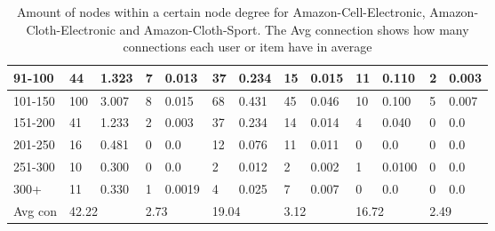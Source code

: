 \begin{table*}[]
\begin{tabular}{|l|l|l|l|l|l|l|l|l|l|l|l|l|}
        91-100  & 44                                          & 1.323                                        & 7                                       & 0.013                      & 37                         & 0.234                      & 15    & 0.015 & 11   & 0.110  & 2     & 0.003 \\ \hline
        101-150 & 100                                         & 3.007                                        & 8                                       & 0.015                      & 68                         & 0.431                      & 45    & 0.046 & 10   & 0.100  & 5     & 0.007 \\ \hline
        151-200 & 41                                          & 1.233                                        & 2                                       & 0.003                      & 37                         & 0.234                      & 14    & 0.014 & 4    & 0.040  & 0     & 0.0   \\ \hline
        201-250 & 16                                          & 0.481                                        & 0                                       & 0.0                        & 12                         & 0.076                      & 11    & 0.011 & 0    & 0.0    & 0     & 0.0   \\ \hline
        251-300 & 10                                          & 0.300                                        & 0                                       & 0.0                        & 2                          & 0.012                      & 2     & 0.002 & 1    & 0.0100 & 0     & 0.0   \\ \hline
        300+    & 11                                          & 0.330                                        & 1                                       & 0.0019                     & 4                          & 0.025                      & 7     & 0.007 & 0    & 0.0    & 0     & 0.0   \\ \hline
        Avg con & \multicolumn{2}{l|}{42.22}                  & \multicolumn{2}{l|}{2.73}                    & \multicolumn{2}{l|}{19.04}              & \multicolumn{2}{l|}{3.12}  & \multicolumn{2}{l|}{16.72} & \multicolumn{2}{l|}{2.49}                                                  \\ \hline
    \end{tabular}
    \caption{Amount of nodes within a certain node degree for Amazon-Cell-Electronic, Amazon-Cloth-Electronic and Amazon-Cloth-Sport. The Avg connection shows how many connections each user or item have in average}
    \label{tab:node-degrees-cell-sport-electronic}
\end{table*}
